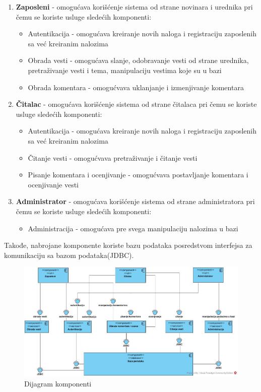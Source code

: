 \documentclass{article}
\begin{document}
\begin{enumerate}
    \item \textbf{Zaposleni} - omogućava korišćenje sistema od strane novinara i urednika pri čemu se koriste usluge sledećih komponenti:
        \begin{itemize}
            \item Autentikacija - omogućava kreiranje novih naloga i registraciju zaposlenih sa već kreiranim nalozima
            \item Obrada vesti - omogućava slanje, odobravanje vesti od strane urednika, pretraživanje vesti i tema, manipulaciju vestima koje su u bazi
            \item Obrada komentara - omogućvava uklanjanje i izmenjivanje komentara
        \end{itemize}
    \item \textbf{Čitalac} - omogućava korišćenje sistema od strane čitalaca pri čemu se koriste usluge sledećih komponenti:
        \begin{itemize}
            \item Autentikacija - omogućava kreiranje novih naloga i registraciju zaposlenih sa već kreiranim nalozima
            \item Čitanje vesti - omogućvava pretraživanje i čitanje vesti
            \item Pisanje komentara i ocenjivanje - omogućvava postavljanje komentara i ocenjivanje vesti
        \end{itemize}
    \item \textbf{Administrator} - omogućava korišćenje sistema od strane administratora pri čemu se koriste usluge sledećih komponenti:
        \begin{itemize}
            \item Administracija - omogućava pre svega manipulaciju nalozima u bazi
        \end{itemize}
\end{enumerate}

Takođe, nabrojane komponente koriste bazu podataka posredstvom interfejsa za komunikaciju sa bazom podataka(JDBC).  

\begin{figure}[htbp!]
    \centering
    \includegraphics[scale=0.38]{Dijagram_komponenti.jpg}
    \caption{Dijagram komponenti}
    \label{slk:dtp}
\end{figure}
\end{document}
